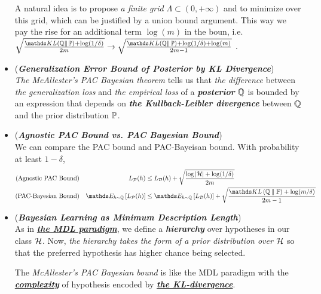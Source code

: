 \documentclass[11pt]{article}
\begin{document}
\begin{itemize}
\begin{remark}
A natural idea is to propose \emph{a finite grid} $\Lambda \subset (0, +\infty)$ and to minimize over this grid, which can be justified by a union bound argument. This way we pay the rise for an additional term $\log(m)$ in the boun, i.e. $\sqrt{\frac{ \kl{\bQ}{\bP}  + \log(1/\delta)}{2m }}  \to \sqrt{\frac{ \kl{\bQ}{\bP}  + \log(1/\delta) + \log(m)}{2m - 1}}$ .
\end{remark}


\item \begin{remark}(\textbf{\emph{Generalization Error Bound of Posterior by KL Divergence}})\\
\emph{The McAllester's PAC Bayesian theorem} tells us that \emph{the difference} between \emph{the generalization loss} and \emph{the empirical loss} of a \emph{\textbf{posterior}} ${\mathbb Q}$ is bounded by an expression that depends on \emph{\textbf{the Kullback-Leibler divergence}} between ${\mathbb Q}$ and the prior distribution ${\mathbb P}$.
\end{remark}

\item \begin{remark}(\textbf{\emph{Agnostic PAC Bound vs. PAC Bayesian Bound}})\\
We can compare the PAC bound and PAC-Bayeisan bound. With probability at least $1-\delta$,
\begin{align*}
(\text{Agnostic PAC Bound}) && L_{\cP}(h) &\le L_{\cD}(h) + \sqrt{\frac{\log\abs{\cH} + \log(1/\delta)}{2m}} \\
(\text{PAC-Bayesian Bound}) &&\E{h \sim \bQ}{L_{\cP}(h)} &\le \E{h \sim \bQ}{L_{\cD}(h)} + \sqrt{\frac{ \kl{\bQ}{\bP}  + \log(m/\delta)}{2m -1}}
\end{align*}
\end{remark}


\item \begin{remark}(\textbf{\emph{Bayesian Learning as Minimum Description Length}})\\
As in \underline{\emph{\textbf{the MDL paradigm}}}, we define a \emph{\textbf{hierarchy}} over hypotheses in our class ${\mathcal H}$. Now, \emph{the hierarchy takes the form of a prior distribution over ${\mathcal H}$} so that the preferred hypothesis has higher chance being selected.  

The \emph{McAllester's PAC Bayesian bound} is like the MDL paradigm with the \underline{\emph{\textbf{complexity}}} of hypothesis encoded by \underline{\emph{\textbf{the KL-divergence}}}. 
\end{remark}


\end{itemize}
\end{document}

